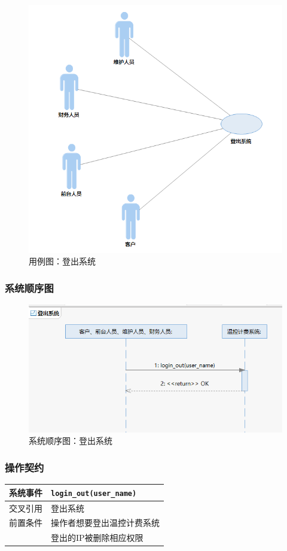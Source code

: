 \documentclass[black,normal,cn]{elegantnote}
\newcommand{\code}[1]{\colorbox{light-gray}{\texttt{#1}}}
\begin{document}
\begin{figure}[H]
    \centering
    \includegraphics[width=.5\textwidth]{fig/276009.png}
    \caption{用例图：登出系统}
    \label{fig:276009}
\end{figure}

\subsubsection{系统顺序图}

\begin{figure}[H]
    \centering
    \includegraphics[width=.8\textwidth]{fig/276010.png}
    \caption{系统顺序图：登出系统}
    \label{fig:276010}
\end{figure}

\subsubsection{操作契约}

\begin{center}
    \begin{tabular}{|>{\centering}m{}|m{}|}
        \hline
        系统事件                  & \multicolumn{1}{l|}{\code{login\_out(user\_name)}} \\
        \hline
        交叉引用                  & 登出系统                                           \\
        \hline
        前置条件                  & 操作者想要登出温控计费系统                         \\
        \hline
        \multirow{1}{*}{后置条件} & 登出的IP被删除相应权限                             \\
        \hline
    \end{tabular}
\end{center}
\end{document}
